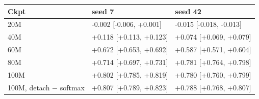 \setlength{\tabcolsep}{3pt}\begin{tabular}{lll}
\toprule
Ckpt & seed 7 & seed 42 \\
\midrule
20M & -0.002 [-0.006, +0.001] & -0.015 [-0.018, -0.013] \\
40M & +0.118 [+0.113, +0.123] & +0.074 [+0.069, +0.079] \\
60M & +0.672 [+0.653, +0.692] & +0.587 [+0.571, +0.604] \\
80M & +0.714 [+0.697, +0.731] & +0.781 [+0.764, +0.798] \\
100M & +0.802 [+0.785, +0.819] & +0.780 [+0.760, +0.799] \\
100M, detach $-$ softmax & +0.807 [+0.789, +0.823] & +0.788 [+0.768, +0.807] \\
\bottomrule
\end{tabular}
